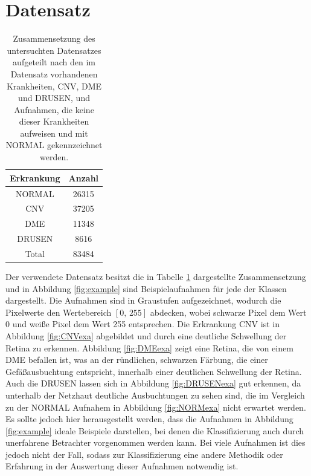 \section{Datensatz}
\begin{table}[!h]
\centering
\caption{Zusammensetzung des untersuchten Datensatzes aufgeteilt nach den im Datensatz vorhandenen Krankheiten, CNV, DME und DRUSEN, und Aufnahmen, die keine dieser Krankheiten aufweisen und mit NORMAL gekennzeichnet werden.}
\label{tab:datacomp}
 \begin{tabular}{|c|c|}
 \hline
 Erkrankung & Anzahl \\
 \hline
 NORMAL & 26315	\\
 CNV &  37205 \\
 DME &	11348	\\	
 DRUSEN & 8616	\\
 \hline
 Total	& 83484\\
 \hline
 \end{tabular}
\end{table}
Der verwendete Datensatz besitzt die in Tabelle \ref{tab:datacomp} dargestellte Zusammensetzung und in Abbildung \ref{fig:example} sind Beispielaufnahmen für jede der Klassen dargestellt. Die Aufnahmen sind in Graustufen aufgezeichnet, wodurch die Pixelwerte den Wertebereich $[0,\,255]$ abdecken, wobei schwarze Pixel dem Wert 0 und weiße Pixel dem Wert 255 entsprechen. Die Erkrankung CNV ist in Abbildung \ref{fig:CNVexa} abgebildet und durch eine deutliche Schwellung der Retina zu erkennen. Abbildung \ref{fig:DMEexa} zeigt eine Retina, die von einem DME befallen ist, was an der ründlichen, schwarzen Färbung, die einer Gefäßausbuchtung entspricht, innerhalb einer deutlichen Schwellung der Retina. Auch die DRUSEN lassen sich in Abbildung \ref{fig:DRUSENexa} gut erkennen, da unterhalb der Netzhaut deutliche Ausbuchtungen zu sehen sind, die im Vergleich zu der NORMAL Aufnahem in Abbildung \ref{fig:NORMexa} nicht erwartet werden. Es sollte jedoch hier herausgestellt werden, dass die Aufnahmen in Abbildung \ref{fig:example} ideale Beispiele darstellen, bei denen die Klassifizierung auch durch unerfahrene Betrachter vorgenommen werden kann. Bei viele Aufnahmen ist dies jedoch nicht der Fall, sodass zur Klassifizierung eine andere Methodik oder Erfahrung in der Auswertung dieser Aufnahmen notwendig ist.  
